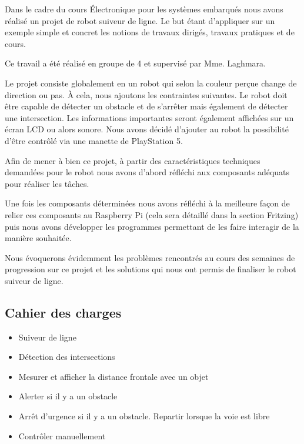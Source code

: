 Dans le cadre du cours Électronique pour les systèmes embarqués nous avons réalisé un projet de robot suiveur de ligne. Le but étant d'appliquer sur un exemple simple et concret les notions de travaux dirigés, travaux pratiques et de cours.

Ce travail a été réalisé en groupe de 4 et supervisé par Mme. Laghmara.

Le projet consiste globalement en un robot qui selon la couleur perçue change de direction ou pas. À cela, nous ajoutons les contraintes suivantes. Le robot doit être capable de détecter un obstacle et de s'arrêter mais également de détecter une intersection. Les informations importantes seront également affichées sur un écran LCD ou alors sonore. Nous avons décidé d'ajouter au robot la possibilité d'être contrôlé via une manette de PlayStation 5.

Afin de mener à bien ce projet, à partir des caractéristiques techniques demandées pour le robot nous avons d'abord réfléchi aux composants adéquats pour réaliser les tâches.

Une fois les composants déterminées nous avons réfléchi à la meilleure façon de relier ces composants au Raspberry Pi (cela sera détaillé dans la section Fritzing) puis nous avons développer les programmes permettant de les faire interagir de la manière souhaitée.

Nous évoquerons évidemment les problèmes rencontrés au cours des semaines de progression sur ce projet et les solutions qui nous ont permis de finaliser le robot suiveur de ligne.

\subsection{Cahier des charges}
\begin{itemize}
    \item Suiveur de ligne
    \item Détection des intersections
    \item Mesurer et afficher la distance frontale avec un objet
    \item Alerter si il y a un obstacle
    \item Arrêt d'urgence si il y a un obstacle. Repartir lorsque la voie est libre
    \item Contrôler manuellement
\end{itemize}